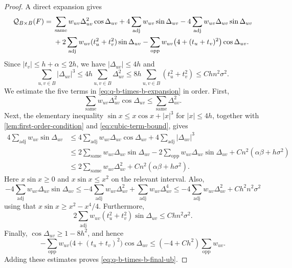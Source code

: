 \documentclass[reqno,11pt]{amsart}
\theoremstyle{definition}
\newcommand{\cQ}{\mathcal{Q}}
\newcommand{\abs}[1]{\left\lvert #1\right\rvert}
\newcommand{\paren}[1]{\left(#1\right)}
\begin{document}
\begin{proof}
A direct expansion gives
\begin{align}\label{eq:q-b-times-b-expansion}
\cQ_{B\times B}(F)
={}&\sum_{\mathrm{same}}w_{uv}\Delta_{uv}^2\cos\Delta_{uv}
+4\sum_{\mathrm{adj}}w_{uv}\sin\Delta_{uv}
-4\sum_{\mathrm{adj}}w_{uv}\Delta_{uv}\sin\Delta_{uv}\notag\\
&+2\sum_{\mathrm{adj}}w_{uv}(t_u^2+t_v^2)\sin\Delta_{uv}
-\sum_{\mathrm{opp}}w_{uv}
  \bigl(4+(t_u+t_v)^2\bigr)\cos\Delta_{uv}.
\end{align}
Since $\abs{t_v}\le h+\alpha\le2h$, we have
$\abs{\Delta_{uv}}\le4h$ and
\begin{equation}\label{eq:cubic-term-bound}
\sum_{u,v\in B}\abs{\Delta_{uv}}^3 \le4h\sum_{u,v\in B}\Delta_{uv}^2
 \le8h\sum_{u,v\in B}(t_u^2+t_v^2)\le Chn^2\sigma^2.
\end{equation}
We estimate the five terms in \eqref{eq:q-b-times-b-expansion} in order.
First,
\[
\sum_{\mathrm{same}}w_{uv}\Delta_{uv}^2\cos\Delta_{uv}
\le\sum_{\mathrm{same}}\Delta_{uv}^2.
\]
Next, the elementary inequality
$\sin x\le x\cos x+\abs{x}^3$ for $\abs{x}\le4h$, together with
\cref{lem:first-order-condition} and \eqref{eq:cubic-term-bound}, gives
\begin{align*}
4\sum_{\mathrm{adj}}w_{uv}\sin\Delta_{uv}
&\le4\sum_{\mathrm{adj}}w_{uv}\Delta_{uv}\cos\Delta_{uv}
  +4\sum_{\mathrm{adj}}\abs{\Delta_{uv}}^3\\
&\le2\sum_{\mathrm{same}}w_{uv}\Delta_{uv}\sin\Delta_{uv}
  -2\sum_{\mathrm{opp}}w_{uv}\Delta_{uv}\sin\Delta_{uv}
  +Cn^2\paren{\alpha\beta+h\sigma^2}\\
&\le2\sum_{\mathrm{same}}w_{uv}\Delta_{uv}^2
  +Cn^2\paren{\alpha\beta+h\sigma^2}.
\end{align*}
Here $x\sin x\ge0$ and $x\sin x\le x^2$ on the relevant interval.
Also,
\begin{equation*}
-4\sum_{\mathrm{adj}}w_{uv}\Delta_{uv}\sin\Delta_{uv}
\le-4\sum_{\mathrm{adj}}w_{uv}\Delta_{uv}^2
  +\sum_{\mathrm{adj}}w_{uv}\Delta_{uv}^4\le-4\sum_{\mathrm{adj}}w_{uv}\Delta_{uv}^2
  +Ch^2n^2\sigma^2
\end{equation*}
using that $x \sin x \ge x^2 - x^4/4$. Furthermore,
\[
2\sum_{\mathrm{adj}}w_{uv}(t_u^2+t_v^2)\sin\Delta_{uv}
\le Chn^2\sigma^2.
\]
Finally, $\cos\Delta_{uv}\ge1-8h^2$, and hence
\[
-\sum_{\mathrm{opp}}w_{uv}
\bigl(4+(t_u+t_v)^2\bigr)\cos\Delta_{uv}
\le\paren{-4+Ch^2}\sum_{\mathrm{opp}}w_{uv}.
\]
Adding these estimates proves \eqref{eq:q-b-times-b-final-ub}.
\end{proof}
\end{document}
